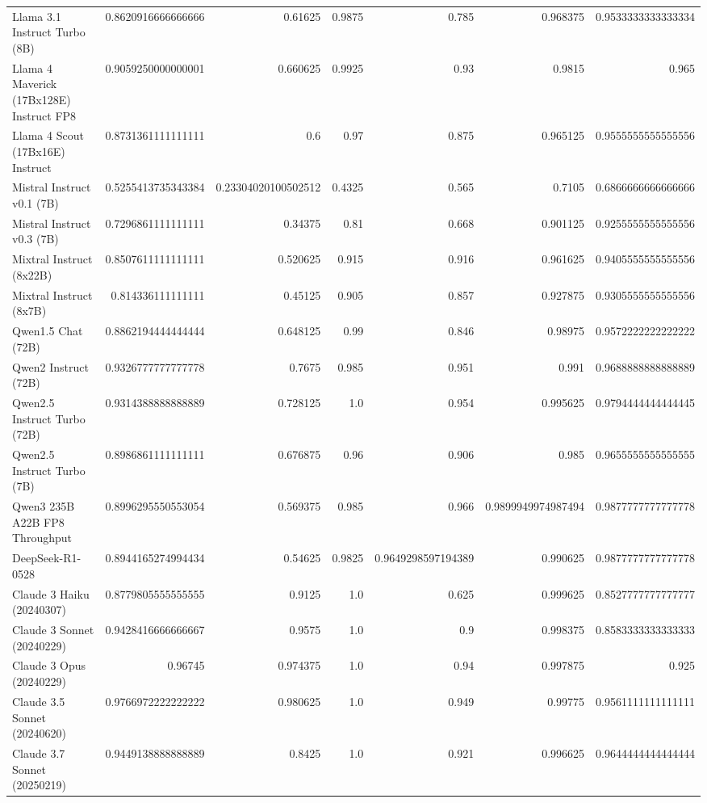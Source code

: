 \begin{table}[htp]
{\begin{tabular}{lrrrrrr}
Llama 3.1 Instruct Turbo (8B) & 0.8620916666666666 & 0.61625 & 0.9875 & 0.785 & 0.968375 & 0.9533333333333334 \\
Llama 4 Maverick (17Bx128E) Instruct FP8 & 0.9059250000000001 & 0.660625 & 0.9925 & 0.93 & 0.9815 & 0.965 \\
Llama 4 Scout (17Bx16E) Instruct & 0.8731361111111111 & 0.6 & 0.97 & 0.875 & 0.965125 & 0.9555555555555556 \\
Mistral Instruct v0.1 (7B) & 0.5255413735343384 & 0.23304020100502512 & 0.4325 & 0.565 & 0.7105 & 0.6866666666666666 \\
Mistral Instruct v0.3 (7B) & 0.7296861111111111 & 0.34375 & 0.81 & 0.668 & 0.901125 & 0.9255555555555556 \\
Mixtral Instruct (8x22B) & 0.8507611111111111 & 0.520625 & 0.915 & 0.916 & 0.961625 & 0.9405555555555556 \\
Mixtral Instruct (8x7B) & 0.814336111111111 & 0.45125 & 0.905 & 0.857 & 0.927875 & 0.9305555555555556 \\
Qwen1.5 Chat (72B) & 0.8862194444444444 & 0.648125 & 0.99 & 0.846 & 0.98975 & 0.9572222222222222 \\
Qwen2 Instruct (72B) & 0.9326777777777778 & 0.7675 & 0.985 & 0.951 & 0.991 & 0.9688888888888889 \\
Qwen2.5 Instruct Turbo (72B) & 0.9314388888888889 & 0.728125 & 1.0 & 0.954 & 0.995625 & 0.9794444444444445 \\
Qwen2.5 Instruct Turbo (7B) & 0.8986861111111111 & 0.676875 & 0.96 & 0.906 & 0.985 & 0.9655555555555555 \\
Qwen3 235B A22B FP8 Throughput & 0.8996295550553054 & 0.569375 & 0.985 & 0.966 & 0.9899949974987494 & 0.9877777777777778 \\
DeepSeek-R1-0528 & 0.8944165274994434 & 0.54625 & 0.9825 & 0.9649298597194389 & 0.990625 & 0.9877777777777778 \\
Claude 3 Haiku (20240307) & 0.8779805555555555 & 0.9125 & 1.0 & 0.625 & 0.999625 & 0.8527777777777777 \\
Claude 3 Sonnet (20240229) & 0.9428416666666667 & 0.9575 & 1.0 & 0.9 & 0.998375 & 0.8583333333333333 \\
Claude 3 Opus (20240229) & 0.96745 & 0.974375 & 1.0 & 0.94 & 0.997875 & 0.925 \\
Claude 3.5 Sonnet (20240620) & 0.9766972222222222 & 0.980625 & 1.0 & 0.949 & 0.99775 & 0.9561111111111111 \\
Claude 3.7 Sonnet (20250219) & 0.9449138888888889 & 0.8425 & 1.0 & 0.921 & 0.996625 & 0.9644444444444444 \\

\end{tabular}}
\end{table}
